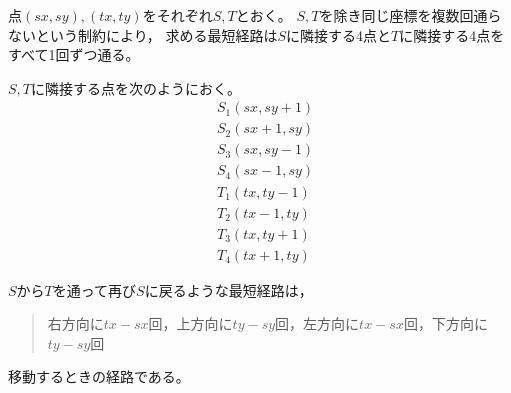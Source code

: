 \documentclass{article}
\begin{document}
点$(sx, sy), (tx, ty)$をそれぞれ$S, T$とおく。
$S, T$を除き同じ座標を複数回通らないという制約により，
求める最短経路は$S$に隣接する4点と$T$に隣接する4点をすべて1回ずつ通る。

$S, T$に隣接する点を次のようにおく。
\begin{eqnarray*}
    &S_1 (sx, sy + 1) \\
    &S_2 (sx + 1, sy) \\
    &S_3 (sx, sy - 1) \\
    &S_4 (sx - 1, sy) \\
    &T_1 (tx, ty - 1) \\
    &T_2 (tx - 1, ty) \\
    &T_3 (tx, ty + 1) \\
    &T_4 (tx + 1, ty)
\end{eqnarray*}


$S$から$T$を通って再び$S$に戻るような最短経路は，
\begin{quote}
右方向に$tx - sx$回，上方向に$ty - sy$回，左方向に$tx - sx$回，下方向に$ty - sy$回
\end{quote}
移動するときの経路である。
\end{document}
